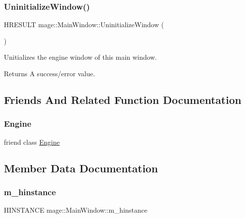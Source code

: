 \subsubsection{\texorpdfstring{Uninitialize\+Window()}{UninitializeWindow()}}
{\footnotesize\ttfamily H\+R\+E\+S\+U\+LT mage\+::\+Main\+Window\+::\+Uninitialize\+Window (\begin{DoxyParamCaption}{ }\end{DoxyParamCaption})\hspace{0.3cm}{\ttfamily [protected]}}

Unitializes the engine window of this main window.

\begin{DoxyReturn}{Returns}
A success/error value. 
\end{DoxyReturn}


\subsection{Friends And Related Function Documentation}
\hypertarget{classmage_1_1_main_window_a3e1914489e4bed4f9f23cdeab34a43dc}{}\label{classmage_1_1_main_window_a3e1914489e4bed4f9f23cdeab34a43dc} 
\subsubsection{\texorpdfstring{Engine}{Engine}}
{\footnotesize\ttfamily friend class \hyperlink{classmage_1_1_engine}{Engine}\hspace{0.3cm}{\ttfamily [friend]}}



\subsection{Member Data Documentation}
\hypertarget{classmage_1_1_main_window_a389348c5949b2cb464a8236bfcff00ef}{}\label{classmage_1_1_main_window_a389348c5949b2cb464a8236bfcff00ef} 
\subsubsection{\texorpdfstring{m\+\_\+hinstance}{m\_hinstance}}
{\footnotesize\ttfamily H\+I\+N\+S\+T\+A\+N\+CE mage\+::\+Main\+Window\+::m\+\_\+hinstance\hspace{0.3cm}{\ttfamily [protected]}}


